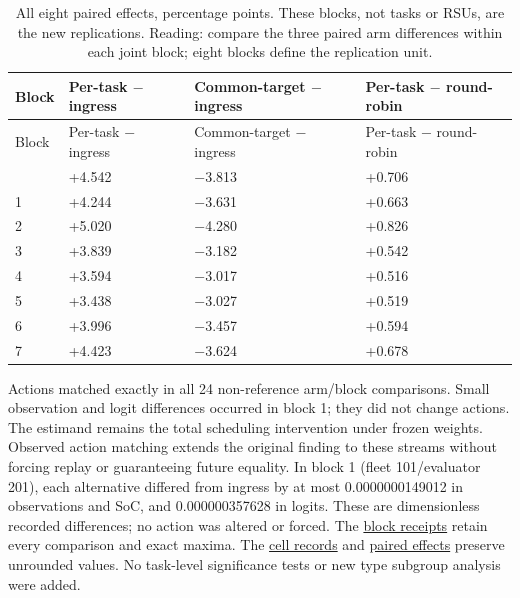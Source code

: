 \documentclass[12pt,a4paper]{article}
\begin{document}
\begingroup
\singlespacing\footnotesize\setlength{\tabcolsep}{3pt}
\renewcommand{\thetable}{E2}
\begin{xltabular}{\textwidth}{@{}YYYY@{}}
\caption[Eight paired effects]{All eight paired effects, percentage points. These blocks, not tasks or RSUs, are the new replications. Reading: compare the three paired arm differences within each joint block; eight blocks define the replication unit.}\label{tab:E2} \\
\toprule
Block & Per-task \ensuremath{-} ingress & Common-target \ensuremath{-} ingress & Per-task \ensuremath{-} round-robin \\
\midrule\endfirsthead
\toprule
Block & Per-task \ensuremath{-} ingress & Common-target \ensuremath{-} ingress & Per-task \ensuremath{-} round-robin \\
\midrule\endhead
\bottomrule{} & +4.542 & \ensuremath{-}3.813 & +0.706 \\
1 & +4.244 & \ensuremath{-}3.631 & +0.663 \\
2 & +5.020 & \ensuremath{-}4.280 & +0.826 \\
3 & +3.839 & \ensuremath{-}3.182 & +0.542 \\
4 & +3.594 & \ensuremath{-}3.017 & +0.516 \\
5 & +3.438 & \ensuremath{-}3.027 & +0.519 \\
6 & +3.996 & \ensuremath{-}3.457 & +0.594 \\
7 & +4.423 & \ensuremath{-}3.624 & +0.678 \\
\end{xltabular}
\endgroup

Actions matched exactly in all 24 non-reference arm/block comparisons. Small observation and logit differences occurred in block 1; they did not change actions. The estimand remains the total scheduling intervention under frozen weights. Observed action matching extends the original finding to these streams without forcing replay or guaranteeing future equality. In block 1 (fleet 101/evaluator 201), each alternative differed from ingress by at most 0.0000000149012 in observations and SoC, and 0.000000357628 in logits. These are dimensionless recorded differences; no action was altered or forced. The \href{\detokenize{../joint_confirmation_2026-09-08/evidence/BLOCK_CONTROLS.json}}{block receipts} retain every comparison and exact maxima. The \href{\detokenize{../joint_confirmation_2026-09-08/evidence/CELL_RESULTS.json}}{cell records} and \href{\detokenize{../joint_confirmation_2026-09-08/evidence/PAIRED_EFFECTS.csv}}{paired effects} preserve unrounded values. No task-level significance tests or new type subgroup analysis were added.
\end{document}
